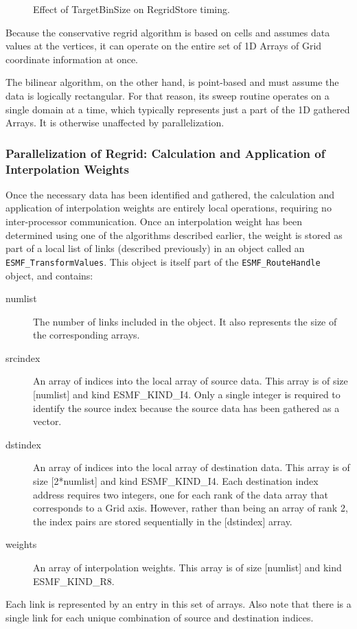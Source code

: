 \begin{center}
\begin{figure}
\caption{Effect of TargetBinSize on RegridStore timing. }
\label{fig:TargetBinSize}
\end{figure}
\end{center}

Because the conservative regrid algorithm is based on cells and assumes data
values at the vertices, it can operate on the entire set of 1D Arrays of Grid
coordinate information at once.

The bilinear algorithm, on the other hand, is point-based and must assume the
data is logically rectangular.  For that reason, its sweep routine operates on
a single domain at a time, which typically represents just a part of the 1D
gathered Arrays.  It is otherwise unaffected by parallelization.


\subsubsection{Parallelization of Regrid: Calculation and Application of
               Interpolation Weights}

Once the necessary data has been identified and gathered, the calculation and
application of interpolation weights are entirely local operations, requiring no
inter-processor communication.  Once an interpolation weight has been determined
using one of the algorithms described earlier, the weight is stored as part of a
local list of links (described previously) in an object called an
{\tt ESMF\_TransformValues}.  This object is itself part of the 
{\tt ESMF\_RouteHandle} object, and contains:
\begin{description}
   \item [numlist]
         The number of links included in the object.  It also represents the
         size of the corresponding arrays.
   \item [srcindex]
         An array of indices into the local array of source data.
         This array is of size [numlist] and kind ESMF\_KIND\_I4.  Only a single
         integer is required to identify the source index because the source data
         has been gathered as a vector.
   \item [dstindex]
         An array of indices into the local array of destination data.
         This array is of size [2*numlist] and kind ESMF\_KIND\_I4.  Each
         destination index address requires two integers, one for each rank
         of the data array that corresponds to a Grid axis.  However, rather
         than being an array of rank 2, the index pairs are stored sequentially
         in the [dstindex] array.
   \item [weights]
         An array of interpolation weights.  This array is of size [numlist] and
         kind ESMF\_KIND\_R8.
\end{description}
Each link is represented by an entry in this set of arrays.  Also note that there
is a single link for each unique combination of source and destination indices.

